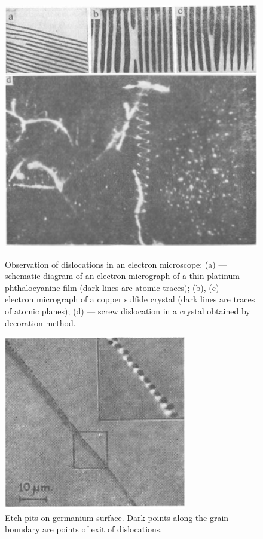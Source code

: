 \begin{figure}[t]
	\begin{minipage}[t]{0.62\linewidth}
		\begin{center}
			\includegraphics[scale=0.8]{figures/ch_02/fig_2_14.pdf}
			\caption[]{Observation of dislocations in an electron microscope: (a) --- schematic diagram of an electron micrograph of a thin platinum phthalocyanine film (dark lines are atomic traces); (b), (c) --- electron micrograph of a copper sulfide crystal (dark lines are traces of atomic planes); (d) --- screw dislocation in a  crystal obtained by decoration method.}
			\label{fig:2_14}
		\end{center}
	\end{minipage}
	\hfill{ }%
	\begin{minipage}[t]{0.34\linewidth}
		\begin{center}
			\includegraphics[scale=0.8]{figures/ch_02/fig_2_15.pdf}
			\caption[]{Etch pits on germanium surface. Dark points along the grain boundary are points of exit of dislocations.}
			\label{fig:2_15}
		\end{center}
	\end{minipage}
\vspace{-0.3cm}
\end{figure}

